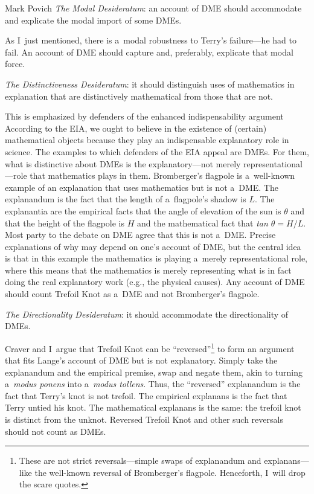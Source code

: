 \begin{artengenv}{Mark Povich}
\textit{The Modal Desideratum}: an account of DME should accommodate and explicate the modal import of some DMEs.
\parencite[][]{baron_explaining_2016}%


As I~just mentioned, there is a~modal robustness to Terry's failure---he had to fail. An account of DME should capture and, preferably, explicate that modal force.

\textit{The Distinctiveness Desideratum}: it should distinguish uses of mathematics in explanation that are distinctively mathematical from those that are not.
\parencite[][]{baron_explaining_2016}%


This is emphasized by defenders of the enhanced indispensability argument
 According to the EIA, we ought to believe in the existence of (certain) mathematical objects because they play an indispensable explanatory role in science. The examples to which defenders of the EIA appeal are DMEs. For them, what is distinctive about DMEs is the explanatory---not merely representational---role that mathematics plays in them. Bromberger's 
\parencite*[][]{bromberger_why-questions_1966} %
 flagpole is a~well-known example of an explanation that uses mathematics but is not a~DME. The explanandum is the fact that the length of a~flagpole's shadow is $L$. The explanantia are the empirical facts that the angle of elevation of the sun is $\theta$ and that the height of the flagpole is $H$ and the mathematical fact that \textit{tan $\theta  = H/L$}. Most party to the debate on DME agree that this is not a~DME. Precise explanations of why may depend on one's account of DME, but the central idea is that in this example the mathematics is playing a~merely representational role, where this means that the mathematics is merely representing what is in fact doing the real explanatory work (e.g., the physical causes). Any account of DME should count Trefoil Knot as a~DME and not Bromberger's flagpole.

\textit{The Directionality Desideratum}: it should accommodate the directionality of DMEs.
\parencite[][]{craver_directionality_2017}%


Craver and I~argue that Trefoil Knot can be ``reversed''\footnote{These are not strict reversals---simple swaps of explanandum and explanans---like the well-known reversal of Bromberger's flagpole. Henceforth, I~will drop the scare quotes. } to form an argument that fits Lange's
\parencite*[][]{priest_mathematical_2013} %
 account of DME but is not explanatory. Simply take the explanandum and the empirical premise, swap and negate them, akin to turning a~\textit{modus ponens} into a~\textit{modus tollens}. Thus, the ``reversed'' explanandum is the fact that Terry's knot is not trefoil. The empirical explanans is the fact that Terry untied his knot. The mathematical explanans is the same: the trefoil knot is distinct from the unknot. Reversed Trefoil Knot and other such reversals should not count as DMEs.


\end{artengenv}
